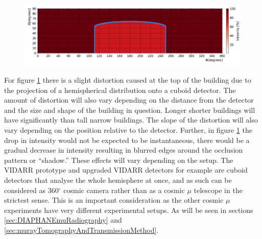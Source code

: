  \begin{figure}[!h]
 \centering
 \includegraphics[width=\linewidth]{Chapter5/Figs/wylfaRasterNew/thetaVsPhiExpectedCube.png}
 \label{fig:thetaVsPhiExpectedCube}
\end{figure}

For figure \ref{fig:thetaVsPhiExpectedCube} there is a slight distortion caused at the top of the building due to the projection of a hemispherical distribution onto a cuboid detector. The amount of distortion will also vary depending on the distance from the detector and the size and shape of the building in question. Longer shorter buildings will have significantly than tall narrow buildings. The slope of the distortion will also vary depending on the position relative to the detector. Further, in figure \ref{fig:thetaVsPhiExpectedCube} the drop in intensity would not be expected to be instantaneous, there would be a gradual decrease in intensity resulting in blurred edges around the occlusion pattern or ``shadow.'' These effects will vary depending on the setup. The VIDARR prototype and upgraded VIDARR detectors for example are cuboid detectors that analyse the whole hemisphere at once, and as such can be considered as 360$^\circ$ cosmic camera rather than as a cosmic $\mu$ telescope in the strictest sense. This is an important consideration as the other cosmic $\mu$ experiments have very different experimental setups. As will be seen in sections \ref{sec:DIAPHANEmuRadiography} and \ref{sec:murayTomographyAndTransmissionMethod}.

